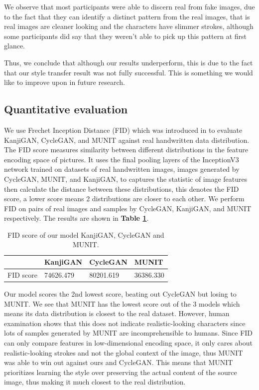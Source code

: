 \documentclass[12pt]{report}
\begin{document}
We observe that most participants were able to discern real from fake images, due to the fact that they can identify a distinct pattern from the real images, that is real images are cleaner looking and the characters have slimmer strokes, although some participants did say that they weren't able to pick up this pattern at first glance.

Thus, we conclude that although our results underperform, this is due to the fact that our style transfer result was not fully successful. This is something we would like to improve upon in future research.

\subsection{Quantitative evaluation}

We use Frechet Inception Distance (FID) which was introduced in \cite{fid} to evaluate KanjiGAN, CycleGAN, and MUNIT against real handwritten data distribution. The FID score measures similarity between different distributions in the feature encoding space of pictures. It uses the final pooling layers of the InceptionV3 network trained on datasets of real handwritten images, images generated by CycleGAN, MUNIT, and KanjiGAN, to captures the statistic of image features then calculate the distance between these distributions, this denotes the FID score, a lower score means 2 distributions are closer to each other. We perform FID on pairs of real images and samples by CycleGAN, KanjiGAN, and MUNIT respectively. The results are shown in \textbf{Table \ref{tbl:fid}}.

\begin{table}[h]
	\centering
	\caption{FID score of our model KanjiGAN, CycleGAN and MUNIT.}
	\label{tbl:fid}
	\begin{tabular}{|l|l|l|l|}
		\hline
		\textbf{} & \textbf{KanjiGAN} & \textbf{CycleGAN} & \textbf{MUNIT}       \\ \hline
		FID score	&74626.479               & 80201.619        & 36386.330              \\ \hline
	\end{tabular}
\end{table}

Our model scores the 2nd lowest score, beating out CycleGAN but losing to MUNIT. We see that MUNIT has the lowest score out of the 3 models which means its data distribution is closest to the real dataset. However, human examination shows that this does not indicate realistic-looking characters since lots of samples generated by MUNIT are incomprehensible to humans. Since FID can only compare features in low-dimensional encoding space, it only cares about realistic-looking strokes and not the global context of the image, thus MUNIT was able to win out against ours and CycleGAN. This means that MUNIT prioritizes learning the style over preserving the actual content of the source image, thus making it much closest to the real distribution.
\end{document}
